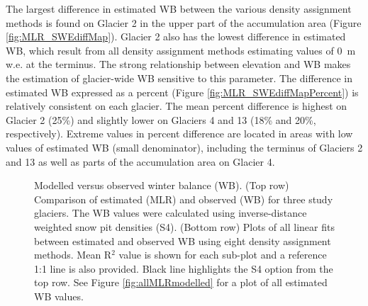 \documentclass{sfuthesis}
\begin{document}
The largest difference in estimated WB between the various density assignment methods is found on Glacier 2 in the upper part of the accumulation area (Figure \ref{fig:MLR_SWEdiffMap}). Glacier 2 also has the lowest difference in estimated WB, which result from all density assignment methods estimating values of 0 \,m\,w.e. at the terminus. The strong relationship between elevation and WB makes the estimation of glacier-wide WB sensitive to this parameter. The difference in estimated WB expressed as a percent (Figure \ref{fig:MLR_SWEdiffMapPercent}) is relatively consistent on each glacier. The mean percent difference is highest on Glacier 2 (25\%) and slightly lower on Glaciers 4 and 13 (18\% and 20\%, respectively). Extreme values in percent difference are located in areas with low values of estimated WB (small denominator), including the terminus of Glaciers 2 and 13 as well as parts of the accumulation area on Glacier 4.  



\begin{figure}[H]
    \centering
    \begin{subfigure}[b]{\textwidth}
    \end{subfigure}
    
    \begin{subfigure}[b]{\textwidth}
    \end{subfigure}

    \caption{Modelled versus observed winter balance (WB). (Top row) Comparison of estimated (MLR) and observed (WB) for three study glaciers. The WB values were calculated using inverse-distance weighted snow pit densities (S4). (Bottom row) Plots of all linear fits between estimated and observed WB using eight density assignment methods. Mean R$^2$ value is shown for each sub-plot and a reference 1:1 line is also provided. Black line highlights the S4 option from the top row. See Figure \ref{fig:allMLRmodelled} for a plot of all estimated WB values.}
    \label{fig:MLRfit}
\end{figure}
\end{document}
